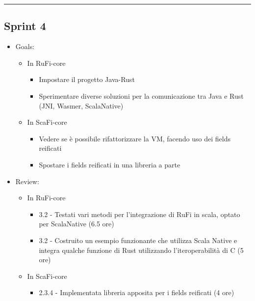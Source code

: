 \documentclass[12pt, a4paper]{article}
\begin{document}
\par\noindent\rule{\textwidth}{0.5pt}

\subsection*{Sprint 4}

\begin{itemize}
    \item Goals:
          \begin{itemize}
              \color{teal}
              \item In RuFi-core
                    \begin{itemize}
                        \item Impostare il progetto Java-Rust
                        \item Sperimentare diverse soluzioni per la comunicazione tra Java e Rust (JNI, Wasmer, ScalaNative)
                    \end{itemize}
                    \color{cyan}
              \item In ScaFi-core
                    \begin{itemize}
                        \item Vedere se è possibile rifattorizzare la VM, facendo uso dei fields reificati
                        \item Spostare i fields reificati in una libreria a parte
                    \end{itemize}
          \end{itemize}
    \item Review:
          \begin{itemize}
              \color{teal}
              \item In RuFi-core
                    \begin{itemize}
                        \item 3.2 - Testati vari metodi per l'integrazione di RuFi in scala, optato per ScalaNative (6.5 ore)
                        \item 3.2 - Costruito un esempio funzionante che utilizza Scala Native e integra qualche funzione di Rust utilizzando l'iteroperabilità di C (5 ore)
                    \end{itemize}
                    \color{cyan}
              \item In ScaFi-core
                    \begin{itemize}
                        \item 2.3.4 - Implementata libreria apposita per i fields reificati (4 ore)
                    \end{itemize}
          \end{itemize}
\end{itemize}
\end{document}
